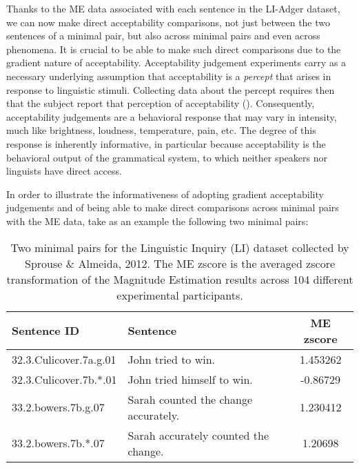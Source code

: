 Thanks to the ME data associated with each sentence in the LI-Adger dataset, we can now make direct acceptability comparisons, not just between the two sentences of a minimal pair, but also across minimal pairs and even across phenomena.  It is crucial to be able to make such direct comparisons due to the gradient nature of acceptability.  Acceptability judgement experiments carry as a necessary underlying assumption that acceptability is a \textit{percept} that arises in response to linguistic stimuli.  Collecting data about the percept requires then that the subject report that perception of acceptability (\citealp{chomsky1965aspects,t2016empirical,sprousealmeida2013,schutze}).  Consequently, acceptability judgements are a behavioral response that may vary in intensity, much like brightness, loudness, temperature, pain, etc.  The degree of this response is inherently informative, in particular because acceptability is the behavioral output of the grammatical system, to which neither speakers nor linguists have direct access.

In order to illustrate the informativeness of adopting gradient acceptability judgements and of being able to make direct comparisons across minimal pairs with the ME data, take as an example the following two minimal pairs:
\begin{table}[h]
    \centering
    \begin{tabular}{llc}
    \toprule
    \textbf{Sentence ID} & \textbf{Sentence} & \textbf{ME zscore} \\
    \midrule
    32.3.Culicover.7a.g.01 & John tried to win. & 1.453262 \\
    32.3.Culicover.7b.*.01 & John tried himself to win. & -0.86729 \\
    33.2.bowers.7b.g.07 & Sarah counted the change accurately. & 1.230412 \\
    33.2.bowers.7b.*.07 & Sarah accurately counted the change. & 1.20698 \\
    \bottomrule
    \end{tabular}
    \caption[Two minimal pairs for the Linguistic Inquiry (LI) dataset]{Two minimal pairs for the Linguistic Inquiry (LI) dataset collected by Sprouse \& Almeida, 2012.  The ME zscore is the averaged zscore transformation of the Magnitude Estimation results across 104 different experimental participants.}
    \label{tab:table_4}
\end{table}


